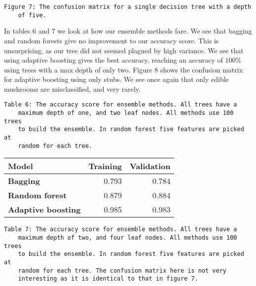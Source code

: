 \documentclass[11pt]{article}
\begin{document}
\begin{center}
\end{center}
\begin{Verbatim}[commandchars=\\\{\}]
	Figure 7: The confusion matrix for a single decision tree with a depth 
	of five.
\end{Verbatim}


In tables 6 and 7 we look at how our ensemble methods fare. We see that bagging and random forests give no improvement to our accuracy score. This is unsurprising, as our tree did not seemed plagued by high variance. We see that using adaptive boosting gives the best accuracy, reaching an accuracy of $100\%$ using trees with a max depth of only two.
Figure 8 shows the confusion matrix for adaptive boosting using only stubs. We see 
once again that only edible mushrooms are misclassified, and very 
rarely.
\begin{Verbatim}[commandchars=\\\{\}]
	Table 6: The accuracy score for ensemble methods. All trees have a 
	maximum depth of one, and two leaf nodes. All methods use 100 trees 
	to build the ensemble. In random forest five features are picked at 
	random for each tree.
\end{Verbatim}
 
\begin{table}[h!]
	\begin{center}
		\label{tab:table1}
		\begin{tabular}{l|r|r}
			\textbf{Model}                                                 	& \textbf{Training} & \textbf{Validation}
			\\ \hline
			\textbf{Bagging}                             		             & 0.793        & 0.784              \\ \hline
			\textbf{Random forest}                                		     & 0.879        & 0.884              \\ \hline
			\textbf{Adaptive boosting}   							    	 & 0.985        & 0.983              \\ \hline
		\end{tabular}
	\end{center}
\end{table}

\newpage
\begin{Verbatim}[commandchars=\\\{\}]
	Table 7: The accuracy score for ensemble methods. All trees have a 
	maximum depth of two, and four leaf nodes. All methods use 100 trees 
	to build the ensemble. In random forest five features are picked at 
	random for each tree. The confusion matrix here is not very 
	interesting as it is identical to that in figure 7. 
\end{Verbatim}
\end{document}
